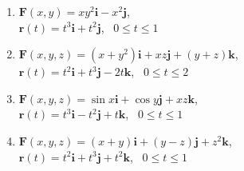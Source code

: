 \documentclass[a4paper, 12pt]{article}
\begin{document}
	\begin{enumerate}[resume]
	
		\item $\textbf{F}(x,y) = xy^{2}\textbf{i} - x^{2}\textbf{j}$, \\ $\textbf{r}(t) = t^{3}\textbf{i} + t^{2}\textbf{j}$, \, $0 \leq t \leq 1$

		\item $\textbf{F}(x,y,z) = (x + y^2)\textbf{i} + xz\textbf{j} + (y + z)\textbf{k}$, \\ $\textbf{r}(t) = t^{2}\textbf{i} + t^{3}\textbf{j} - 2t\textbf{k}$, \, $0 \leq t \leq 2$

		\item $\textbf{F}(x,y,z) = \sin{x}\textbf{i} + \cos{y}\textbf{j} + xz\textbf{k}$, \\ $\textbf{r}(t) = t^{3}\textbf{i} - t^{2}\textbf{j} + t\textbf{k}$, \, $0 \leq t \leq 1$

		\item $\textbf{F}(x,y,z) = (x + y)\textbf{i} + (y - z)\textbf{j} + z^2\textbf{k}$, \\ $\textbf{r}(t) = t^{2}\textbf{i} + t^{3}\textbf{j} + t^{2}\textbf{k}$, \, $0 \leq t \leq 1$
		\resposta{\fazer}
	
	\end{enumerate}
		
	\vspace{5mm}	
	
\end{document}
